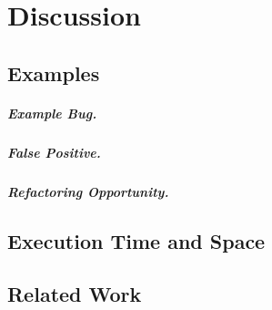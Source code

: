 \chapter{Discussion}\label{chap:discussion}

\section{Examples}

\paragraph{Example Bug.}
\paragraph{False Positive.}
\paragraph{Refactoring Opportunity.}

\section{Execution Time and Space}

\section{Related Work}
